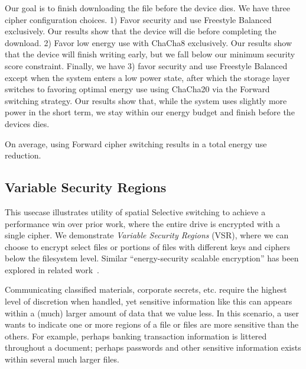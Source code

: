 Our goal is to finish downloading the file before the device dies. We have three
cipher configuration choices. 1) Favor security and use Freestyle Balanced
exclusively. Our results show that the device will die before completing the
download. 2) Favor low energy use with ChaCha8 exclusively. Our results show
that the device will finish writing early, but we fall below our minimum
security score constraint. Finally, we have 3) favor security and use Freestyle
Balanced except when the system enters a low power state, after which the
storage layer switches to favoring optimal energy use using ChaCha20 via the
Forward switching strategy. Our results show that, while the system uses
slightly more power in the short term, we stay within our energy budget and
finish before the devices dies. 

On average, using Forward cipher switching results in a  total energy
use reduction.

\subsection{Variable Security Regions}

This usecase illustrates utility of spatial Selective switching to achieve a
performance win over prior work, where the entire drive is encrypted with a
single cipher. We demonstrate \emph{Variable Security Regions} (VSR), where we
can choose to encrypt select files or portions of files with different keys and
ciphers below the filesystem level. Similar ``energy-security scalable
encryption'' has been explored in related work~\cite{ScalableEncryption}.

Communicating classified materials, corporate secrets, etc. require the highest
level of discretion when handled, yet sensitive information like this can
appears within a (much) larger amount of data that we value less. In this
scenario, a user wants to indicate one or more regions of a file or files are
more sensitive than the others. For example, perhaps banking transaction
information is littered throughout a document; perhaps passwords and other
sensitive information exists within several much larger files. 


